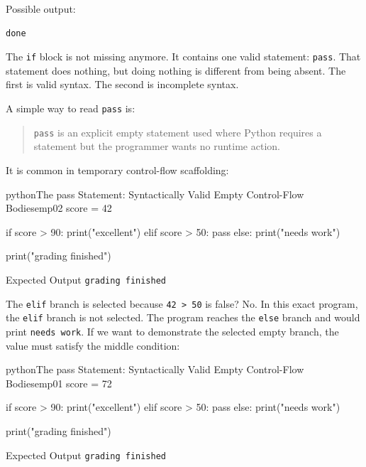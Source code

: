 Possible output:

\begin{verbatim}
done
\end{verbatim}

The \texttt{if} block is not missing anymore. It contains one valid statement: \texttt{pass}. That statement does nothing, but doing nothing is different from being absent. The first is valid syntax. The second is incomplete syntax.

A simple way to read \texttt{pass} is:

\begin{quote}
\texttt{pass} is an explicit empty statement used where Python requires a statement but the programmer wants no runtime action.
\end{quote}

It is common in temporary control-flow scaffolding:

\begin{codebox}[]{python}{The pass Statement: Syntactically Valid Empty Control-Flow Bodies}{emp02}
score = 42

if score > 90:
    print("excellent")
elif score > 50:
    pass
else:
    print("needs work")

print("grading finished")
\end{codebox}


\begin{iobox}{Expected Output}
\texttt{grading finished} \\
\end{iobox}


The \texttt{elif} branch is selected because \texttt{42 > 50} is false? No. In this exact program, the \texttt{elif} branch is not selected. The program reaches the \texttt{else} branch and would print \texttt{needs work}. If we want to demonstrate the selected empty branch, the value must satisfy the middle condition:

\begin{codebox}[]{python}{The pass Statement: Syntactically Valid Empty Control-Flow Bodies}{emp01}
score = 72

if score > 90:
    print("excellent")
elif score > 50:
    pass
else:
    print("needs work")

print("grading finished")
\end{codebox}


\begin{iobox}{Expected Output}
\texttt{grading finished} \\
\end{iobox}


